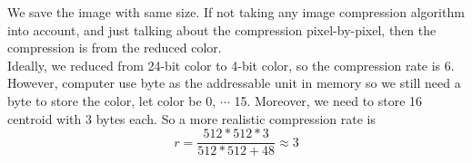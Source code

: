 \begin{answer}

We save the image with same size. If not taking any image compression algorithm into account, and just talking about the compression pixel-by-pixel, then the compression is from the reduced color. \\ 

Ideally, we reduced from 24-bit color to 4-bit color, so the compression rate is 6. However, computer use byte as the addressable unit in memory so we still need a byte to store the color, let color be 0, $\cdots$ 15. Moreover, we need to store 16 centroid with 3 bytes each. So a more realistic compression rate is 
\begin{equation}
    r = \frac{512 * 512 * 3}{512 * 512 + 48} \approx 3
\end{equation}
\end{answer}
